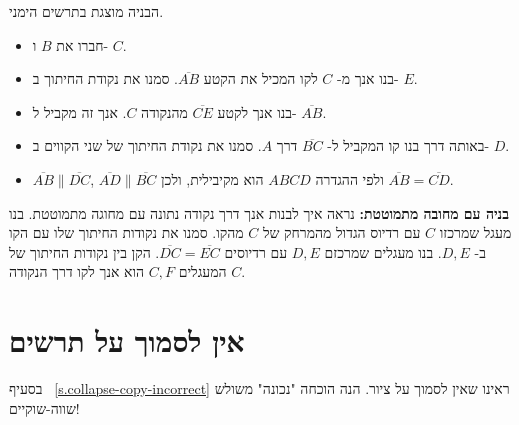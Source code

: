 הבניה מוצגת בתרשים הימני.
\begin{itemize}
\item
חברו את
$B$
ו-%
$C$.
\item
בנו אנך מ-%
$C$
לקו המכיל את הקטע
$\overline{AB}$.
סמנו את נקודת החיתוך ב-%
$E$.
\item
בנו אנך לקטע
$\overline{CE}$
מהנקודה
$C$.
אנך זה מקביל ל-%
$\overline{AB}$.
\item
באותה דרך בנו קו המקביל ל-%
$\overline{BC}$
דרך 
$A$.
סמנו את נקודת החיתוך של שני הקווים ב-%
$D$.
\item
$\overline{AB}\|\overline{DC}$, $\overline{AD}\|\overline{BC}$
ולפי ההגדרה
$ABCD$
הוא מקיבילית, ולכן 
$\overline{AB}=\overline{CD}$.
\end{itemize}

\textbf{בניה עם מחובה מתמוטטת:}
נראה איך לבנות אנך דרך נקודה נתונה עם מחוגה מתמוטטת. בנו מעגל שמרכזו
$C$
עם רדיוס הגדול מהמרחק של
$C$
מהקו. סמנו את נקודות החיתוך שלו עם הקו ב-%
$D,E$.
בנו מעגלים שמרכזם
$D,E$
עם רדיוסים
$\overline{DC}=\overline{EC}$.
הקן בין נקודות החיתוך של המעגלים
$C,F$
הוא אנך לקו דרך הנקודה 
$C$.
\begin{center}

\end{center}



\section{
אין לסמוך על תרשים
}\label{s.collapse-isoceles}
בסעיף~%
\ref{s.collapse-copy-incorrect}
ראינו שאין לסמוך על ציור. הנה הוכחה "נכונה"
\textbf{}
משולש שווה-שוקיים!

